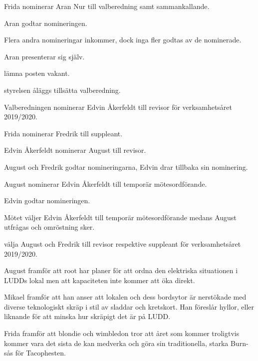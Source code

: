 \documentclass{protokoll}
\begin{document}
Frida nominerar Aran Nur till valberedning samt sammankallande. 

Aran godtar nomineringen. 

Flera andra nomineringar inkommer, dock inga fler godtas av de nominerade. 

Aran presenterar sig själv. 

\begin{beslut}
  \att lämna posten vakant. 
\end{beslut}

\begin{beslut}
  \att styrelsen åläggs tillsätta valberedning.
\end{beslut}

Valberedningen nominerar Edvin Åkerfeldt till revisor för verksamhetsåret 2019/2020.

Frida nominerar Fredrik till suppleant. 

Edvin Åkerfeldt nominerar August till revisor.

August och Fredrik godtar nomineringarna, Edvin drar tillbaka sin nominering. 

August nominerar Edvin Åkerfeldt till temporär mötesordförande. 

Edvin godtar nomineringen. 

Mötet väljer Edvin Åkerfeldt till temporär mötesordförande medans August
utfrågas och omröstning sker. 

\begin{beslut}
  \att välja August och Fredrik till revisor respektive suppleant för verksamhetsåret 2019/2020.
\end{beslut}

August framför att root har planer för att ordna den elektriska situationen
i LUDDs lokal men att kapaciteten inte kommer att öka direkt.

Mikael framför att han anser att lokalen och dess bordsytor är nerstökade med 
diverse teknologiskt skräp i stil av sladdar och kretskort. Han föreslår 
hyllor, eller liknande för att minska hur skräpigt det är på LUDD.

Frida framför att blondie och wimbledon tror att året som kommer troligtvis
kommer vara det sista de kan medverka och göra sin traditionella, starka 
Burn-sås för Tacophesten.
\newpage
\end{document}
